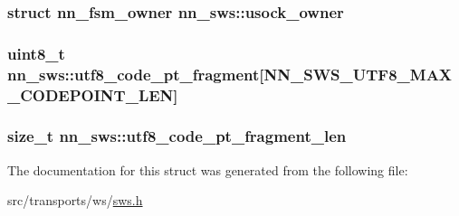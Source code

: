 \subsubsection[{usock\+\_\+owner}]{\setlength{\rightskip}{0pt plus 5cm}struct {\bf nn\+\_\+fsm\+\_\+owner} nn\+\_\+sws\+::usock\+\_\+owner}\hypertarget{structnn__sws_a4bab9824cd6a75292195050f84075619}{}\label{structnn__sws_a4bab9824cd6a75292195050f84075619}
\subsubsection[{utf8\+\_\+code\+\_\+pt\+\_\+fragment}]{\setlength{\rightskip}{0pt plus 5cm}uint8\+\_\+t nn\+\_\+sws\+::utf8\+\_\+code\+\_\+pt\+\_\+fragment\mbox{[}{\bf N\+N\+\_\+\+S\+W\+S\+\_\+\+U\+T\+F8\+\_\+\+M\+A\+X\+\_\+\+C\+O\+D\+E\+P\+O\+I\+N\+T\+\_\+\+L\+EN}\mbox{]}}\hypertarget{structnn__sws_a3cc64cfede7585a310444e2f0b38a3ea}{}\label{structnn__sws_a3cc64cfede7585a310444e2f0b38a3ea}
\subsubsection[{utf8\+\_\+code\+\_\+pt\+\_\+fragment\+\_\+len}]{\setlength{\rightskip}{0pt plus 5cm}size\+\_\+t nn\+\_\+sws\+::utf8\+\_\+code\+\_\+pt\+\_\+fragment\+\_\+len}\hypertarget{structnn__sws_a20193a81bc65b1a5674f0abba06ed89f}{}\label{structnn__sws_a20193a81bc65b1a5674f0abba06ed89f}


The documentation for this struct was generated from the following file\+:\begin{DoxyCompactItemize}
\item 
src/transports/ws/\hyperlink{sws_8h}{sws.\+h}\end{DoxyCompactItemize}
